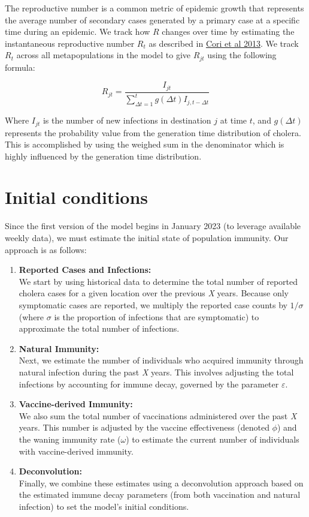 \documentclass[
]{book}
\begin{document}
The reproductive number is a common metric of epidemic growth that represents the average number of secondary cases generated by a primary case at a specific time during an epidemic. We track how \(R\) changes over time by estimating the instantaneous reproductive number \(R_t\) as described in \href{https://academic.oup.com/aje/article/178/9/1505/89262}{Cori et al 2013}. We track \(R_t\) across all metapopulations in the model to give \(R_{jt}\) using the following formula:

\begin{equation}
R_{jt} = \frac{I_{jt}}{\sum_{\Delta t=1}^{t} g(\Delta t) I_{j,t-\Delta t}}
\label{eq:R}
\end{equation}

Where \(I_{jt}\) is the number of new infections in destination \(j\) at time \(t\), and
\(g(\Delta t)\) represents the probability value from the generation time distribution of cholera. This is accomplished by using the weighed sum in the denominator which is highly influenced by the generation time distribution.

\section{Initial conditions}\label{initial-conditions}

Since the first version of the model begins in January 2023 (to leverage available weekly data), we must estimate the initial state of population immunity. Our approach is as follows:

\begin{enumerate}
\def\labelenumi{\arabic{enumi}.}
\item
  \textbf{Reported Cases and Infections:}\\
  We start by using historical data to determine the total number of reported cholera cases for a given location over the previous \emph{X} years. Because only symptomatic cases are reported, we multiply the reported case counts by \(1/\sigma\) (where \(\sigma\) is the proportion of infections that are symptomatic) to approximate the total number of infections.
\item
  \textbf{Natural Immunity:}\\
  Next, we estimate the number of individuals who acquired immunity through natural infection during the past \emph{X} years. This involves adjusting the total infections by accounting for immune decay, governed by the parameter \(\varepsilon\).
\item
  \textbf{Vaccine-derived Immunity:}\\
  We also sum the total number of vaccinations administered over the past \emph{X} years. This number is adjusted by the vaccine effectiveness (denoted \(\phi\)) and the waning immunity rate (\(\omega\)) to estimate the current number of individuals with vaccine-derived immunity.
\item
  \textbf{Deconvolution:}\\
  Finally, we combine these estimates using a deconvolution approach based on the estimated immune decay parameters (from both vaccination and natural infection) to set the model's initial conditions.
\end{enumerate}
\end{document}
